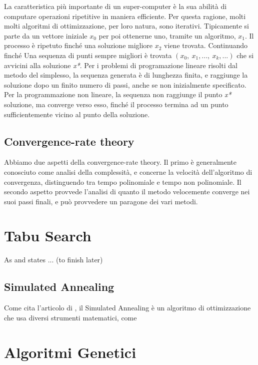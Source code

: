 \documentclass{article}
\begin{document}
La caratteristica più importante di un super-computer è la sua abilità di
computare operazioni ripetitive in maniera efficiente. Per questa ragione,
molti molti algoritmi di ottimizzazione, per loro natura, sono iterativi.
Tipicamente si parte da un vettore iniziale \(x_0\) per poi ottenerne uno, tramite un algoritmo, \(x_1\).
Il processo è ripetuto finché una soluzione migliore \(x_2\) viene trovata. Continuando finché 
Una sequenza di punti sempre migliori è trovata \( (x_0 , \ x_1 , ..., \ x_k , ...  )\) che si avvicini 
alla soluzione \textit{x*}. Per i problemi di programazione lineare risolti dal metodo del simplesso,
la sequenza generata è di lunghezza finita, e raggiunge la soluzione dopo un finito
numero di passi, anche se non inizialmente specificato.
Per la programmazione non lineare, la sequenza non raggiunge il punto \textit{x*} soluzione, 
ma converge verso esso, finché il processo termina ad un punto sufficientemente vicino al 
punto della soluzione.

\subsection{Convergence-rate theory}

Abbiamo due aspetti della convergence-rate theory. Il primo è generalmente 
conosciuto come analisi della complessità, e concerne la velocità dell'algoritmo 
di convergenza, distinguendo tra tempo polinomiale e tempo non polinomiale.
Il secondo aspetto provvede l'analisi di quanto il metodo velocemente converge 
nei suoi passi finali, e può provvedere un paragone dei vari metodi.

\section{Tabu Search}

As \textcite{TabuSearch} and \textcite{LocalSearch} states ... (to finish later)

\subsection{Simulated Annealing}

Come cita l'articolo di  \textcite{SimulatedAnnealing01}, il Simulated Annealing
è un algoritmo di ottimizzazione che usa diversi strumenti matematici, come 

\section{Algoritmi Genetici}

\printbibliography[title = {Bibliografia e crediti}]
\end{document}
